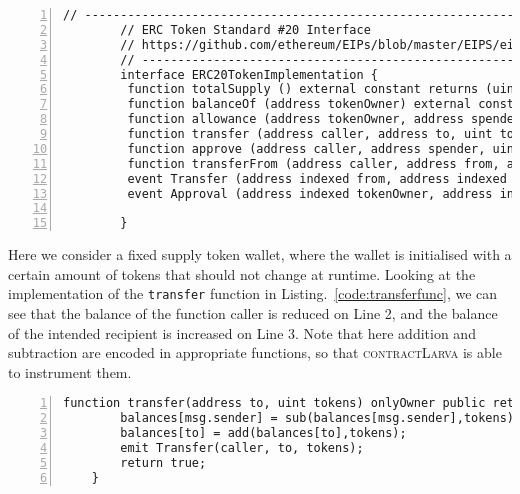 \documentclass{article}
\newcommand{\contractlarva}{\textsc{contractLarva}\xspace}
\begin{document}
       \small\begin{lstlisting}[language=DEA,basicstyle=\scriptsize,numbers=left,numbersep=2pt,xleftmargin=0.3cm,escapechar=\%,label={code:erc20interface},caption={ERC20 interface.}]
        // ----------------------------------------------------------------------------
        // ERC Token Standard #20 Interface
        // https://github.com/ethereum/EIPs/blob/master/EIPS/eip-20-token-standard.md
        // ----------------------------------------------------------------------------
        interface ERC20TokenImplementation {
         function totalSupply () external constant returns (uint);
         function balanceOf (address tokenOwner) external constant returns (uint balance);
         function allowance (address tokenOwner, address spender) external constant returns (uint remaining);
         function transfer (address caller, address to, uint tokens) external returns (bool success);
         function approve (address caller, address spender, uint tokens) external returns (bool success);
         function transferFrom (address caller, address from, address to, uint tokens) external returns (bool success);
         event Transfer (address indexed from, address indexed to, uint tokens);
         event Approval (address indexed tokenOwner, address indexed spender, uint tokens);
        
        }
            \end{lstlisting}\normalsize
   
   Here we consider a fixed supply token wallet, where the wallet is initialised with a certain amount of tokens that should not change at runtime. Looking at the implementation of the \texttt{transfer} function in Listing.~\ref{code:transferfunc}, we can see that the balance of the function caller is reduced on Line 2, and the balance of the intended recipient is increased on Line 3. Note that here addition and subtraction are encoded in appropriate functions, so that \contractlarva is able to instrument them.
         
         
             \small\begin{lstlisting}[language=DEA,basicstyle=\scriptsize,numbers=left,numbersep=2pt,xleftmargin=0.3cm,escapechar=\%,label={code:transferfunc},caption={\texttt{transfer} function.}]
    function transfer(address to, uint tokens) onlyOwner public returns (bool success) {
        balances[msg.sender] = sub(balances[msg.sender],tokens);
        balances[to] = add(balances[to],tokens);
        emit Transfer(caller, to, tokens);
        return true;
    }
                  \end{lstlisting}\normalsize
\end{document}
